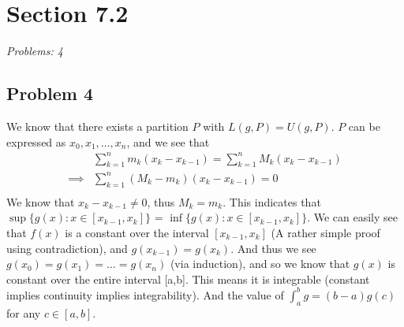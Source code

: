 \documentclass[12pt]{article}
\begin{document}
\vspace*{1cm}


\section*{Section 7.2}
\textit{Problems: 4}

\subsection*{Problem 4}
We know that there exists a partition $P$ with $L(g, P) = U(g,P)$. 
$P$ can be expressed as ${x_0, x_1, \dots, x_n}$, and we see that 
\begin{align*}
&\sum_{k=1}^{n}m_k(x_k - x_{k-1}) = \sum_{k=1}^{n}M_k(x_k - x_{k-1}) \\
\implies &\sum_{k=1}^{n}(M_k - m_k)(x_k - x_{k-1}) = 0\\
\end{align*}
We know that $x_{k} - x_{k-1} \ne 0$, thus $M_k = m_k$.
This indicates that $\sup \{g(x): x \in [x_{k-1}, x_{k}]\}$ = $\inf \{g(x): x \in [x_{k-1}, x_{k}]\}$. 
We can easily see that $f(x)$ is a constant over the interval $[x_{k-1}, x_k]$ (A rather simple proof using contradiction), and $g(x_{k-1}) = g(x_k)$.
And thus we see $g(x_0) = g(x_1) = \dots = g(x_n)$ (via induction), and so we know that $g(x)$ is constant over the entire interval [a,b]. 
This means it is integrable (constant implies continuity implies integrability). 
And the value of $\int_{a}^{b}g = (b-a)g(c)$ for any $c \in [a,b]$. 
\end{document}
